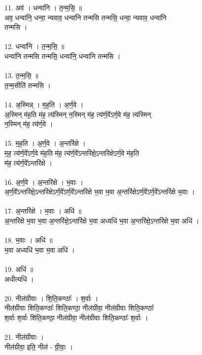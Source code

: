 11. अव॑ । धन्वा॑नि । त॒न्म॒सि॒ ॥\\
अव॒ धन्वा॑नि॒ धन्वा॒ न्यवाव॒ धन्वा॑नि तन्मसि तन्मसि॒ धन्वा॒ न्यवाव॒ धन्वा॑नि\\
तन्मसि ।\\
\\
12. धन्वा॑नि । त॒न्म॒सि॒ ॥\\
धन्वा॑नि तन्मसि तन्मसि॒ धन्वा॑नि॒ धन्वा॑नि तन्मसि ।\\
\\
13. त॒न्म॒सि॒ ॥\\
त॒न्म॒सीति॑ तन्मसि ।\\
\\
14. अ॒स्मिन्न् । म॒ह॒ति । अ॒र्ण॒वे ।\\
अ॒स्मिन् म॑ह॒ति म॑ह॒ त्य॑स्मिन् न॒स्मिन् म॑ह॒ त्य॑र्ण॒वे᳚ऽर्ण॒वे म॑ह॒ त्य॑स्मिन्\\
न॒स्मिन् म॑ह॒ त्य॑र्ण॒वे ।\\
\\
15. म॒ह॒ति । अ॒र्ण॒वे । अ॒न्तरि॑क्षे ।\\
म॒ह॒ त्य॑र्ण॒वे᳚ऽर्ण॒वे म॑ह॒ति म॑ह॒ त्य॑र्ण॒वे᳚ऽन्तरि॑क्षे॒ऽन्तरि॑क्षेऽर्ण॒वे म॑ह॒ति\\
म॑ह॒ त्य॑र्ण॒वे᳚ऽन्तरि॑क्षे ।\\
\\
16. अ॒र्ण॒वे । अ॒न्तरि॑क्षे । भ॒वाः ।\\
अ॒र्ण॒वे᳚ऽन्तरि॑क्षे॒ऽन्तरि॑क्षेऽर्ण॒वे᳚ऽर्ण॒वे᳚ऽन्तरि॑क्षे भ॒वा भ॒वा अ॒न्तरि॑क्षेऽर्ण॒वे᳚ऽर्ण॒वे᳚ऽन्तरि॑क्षे भ॒वाः ।\\
\\
17. अ॒न्तरि॑क्षे । भ॒वाः । अधि॑ ॥\\
अ॒न्तरि॑क्षे भ॒वा भ॒वा अ॒न्तरि॑क्षे॒ऽन्तरि॑क्षे भ॒वा अध्यधि॑ भ॒वा अ॒न्तरि॑क्षे॒ऽन्तरि॑क्षे भ॒वा अधि॑ ।\\
\\
18. भ॒वाः । अधि॑ ॥\\
भ॒वा अध्यधि॑ भ॒वा भ॒वा अधि॑ ।\\
\\
19. अधि॑ ॥\\
अधीत्यधि॑ ।\\
\\
20. नील॑ग्रीवाः । शि॒ति॒कण्ठाः᳚ । श॒र्वाः ।\\
नील॑ग्रीवाः शिति॒कण्ठाः᳚ शिति॒कण्ठा॒ नील॑ग्रीवा॒ नील॑ग्रीवाः शिति॒कण्ठाः᳚\\
श॒र्वाः श॒र्वाः शि॑ति॒कण्ठा॒ नील॑ग्रीवा॒ नील॑ग्रीवाः शिति॒कण्ठाः᳚ श॒र्वाः ।\\
\\
21. नील॑ग्रीवाः ।\\
नील॑ग्रीवा॒ इति॒ नील॑ - ग्री॒वाः॒ ।\\
